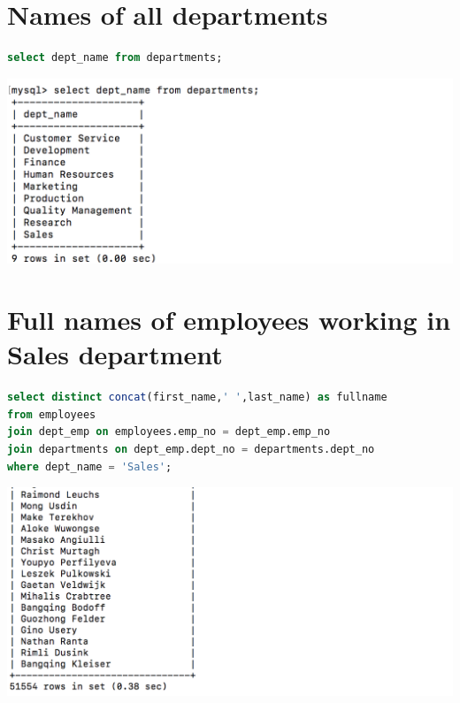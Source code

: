 \documentclass{article}
\begin{document}
\section{Names of all departments}
\begin{lstlisting}[language=sql]
	select dept_name from departments;
\end{lstlisting}
\includegraphics[width=\linewidth]{out4.png}

\section{Full names of employees working in Sales department}
\begin{lstlisting}[language=sql]
select distinct concat(first_name,' ',last_name) as fullname 
from employees 
join dept_emp on employees.emp_no = dept_emp.emp_no 
join departments on dept_emp.dept_no = departments.dept_no
where dept_name = 'Sales';
\end{lstlisting}
\includegraphics[width=\linewidth]{out5.png}
\end{document}
